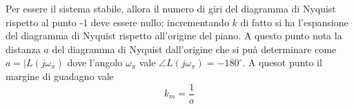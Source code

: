 		Per essere il sistema stabile, allora il numero di giri del diagramma di Nyquist rispetto al punto -1 deve essere nullo; incrementando $k$ di fatto si ha l'espansione del diagramma di Nyquist rispetto all'origine del piano. A questo punto  nota la distanza $a$  del diagramma di Nyquist dall'origine che si puà determinare come $a = |L(j\omega_\pi)$ dove l'angolo $\omega_\pi$ vale $ \angle L(j\omega_\pi) = -180^\circ$. A quesot punto il margine di guadagno vale
		\[ k_m = \frac 1 a \]